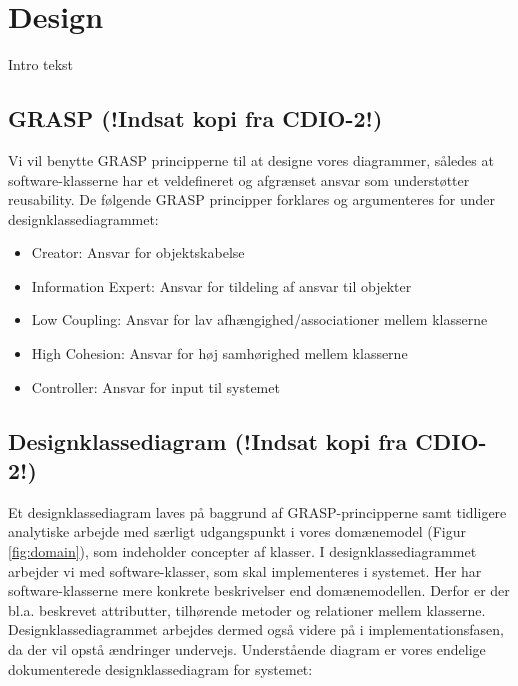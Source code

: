 \documentclass[../main.tex]{subfiles}
\begin{document}
\section{Design}

\begin{flushleft} 
\TODO Intro tekst
\end{flushleft}


\subsection{GRASP (!Indsat kopi fra CDIO-2!)}
\begin{flushleft}
Vi vil benytte GRASP principperne til at designe vores diagrammer, således at software-klasserne har et veldefineret og afgrænset ansvar som understøtter reusability. \newline
\newline
De følgende GRASP principper forklares og argumenteres for under designklassediagrammet:
\begin{itemize}
    \item Creator: Ansvar for objektskabelse
    \item Information Expert: Ansvar for tildeling af ansvar til objekter
    \item Low Coupling: Ansvar for lav afhængighed/associationer mellem klasserne
    \item High Cohesion: Ansvar for høj samhørighed mellem klasserne
    \item Controller: Ansvar for input til systemet
\end{itemize}
\end{flushleft}


\subsection{Designklassediagram (!Indsat kopi fra CDIO-2!)}
\begin{flushleft}
Et designklassediagram laves på baggrund af GRASP-principperne samt tidligere analytiske arbejde med særligt udgangspunkt i  vores domænemodel (Figur \ref{fig:domain}), som indeholder concepter af klasser. I designklassediagrammet arbejder vi med software-klasser, som skal implementeres i systemet. Her har software-klasserne mere konkrete beskrivelser end domænemodellen. Derfor er der bl.a. beskrevet attributter, tilhørende metoder og relationer mellem klasserne. Designklassediagrammet arbejdes dermed også videre på i implementationsfasen, da der vil opstå ændringer undervejs. Understående diagram er vores endelige dokumenterede designklassediagram for systemet:
\end{flushleft}
\end{document}
